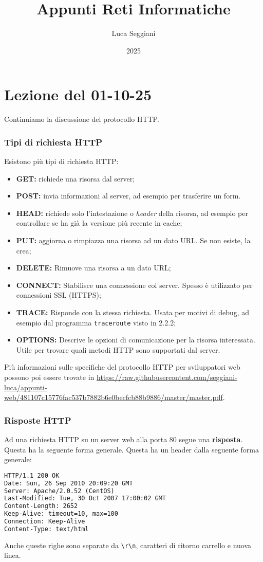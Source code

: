 \documentclass[a4paper,11pt]{article}
\title{Appunti Reti Informatiche}
\author{Luca Seggiani}
\date{2025}
\begin{document}
\section{Lezione del 01-10-25}

\thispagestyle{empty}
\pagestyle{fancy}

Continuiamo la discussione del protocollo HTTP.

\subsubsection{Tipi di richiesta HTTP}
Esistono più tipi di richiesta HTTP:
\begin{itemize}
	\item \textbf{GET:} richiede una risorsa dal server;
	\item \textbf{POST:} invia informazioni al server, ad esempio per trasferire un form.
	\item \textbf{HEAD:} richiede solo l'intestazione o \textit{header} della risorsa, ad esempio per controllare se ha già la versione più recente in cache;
	\item \textbf{PUT:} aggiorna o rimpiazza una risorsa ad un dato URL. Se non esiste, la crea;
	\item \textbf{DELETE:} Rimuove una risorsa a un dato URL;
	\item \textbf{CONNECT:} Stabilisce una connessione col server. Spesso è utilizzato per connessioni SSL (HTTPS);
	\item \textbf{TRACE:} Risponde con la stessa richiesta. Usata per motivi di debug, ad esempio dal programma \lstinline|traceroute| visto in 2.2.2;
	\item \textbf{OPTIONS:} Descrive le opzioni di comunicazione per la risorsa interessata. Utile per trovare quali metodi HTTP sono supportati dal server.
\end{itemize}

Più informazioni sulle specifiche del protocollo HTTP per sviluppatori web possono poi essere trovate in \url{https://raw.githubusercontent.com/seggiani-luca/appunti-web/481107c15776fac537b7882b6e0becfcb88b9886/master/master.pdf}. 

\subsubsection{Risposte HTTP}
Ad una richiesta HTTP su un server web alla porta 80 segue una \textbf{risposta}. Questa ha la seguente forma generale. Questa ha un header dalla seguente forma generale:
\begin{lstlisting}[language=html, style=codestyle]	
HTTP/1.1 200 OK
Date: Sun, 26 Sep 2010 20:09:20 GMT
Server: Apache/2.0.52 (CentOS)
Last-Modified: Tue, 30 Oct 2007 17:00:02 GMT
Content-Length: 2652
Keep-Alive: timeout=10, max=100
Connection: Keep-Alive
Content-Type: text/html
\end{lstlisting}
Anche queste righe sono separate da \lstinline|\r\n|, caratteri di ritorno carrello e nuova linea.
\end{document}
